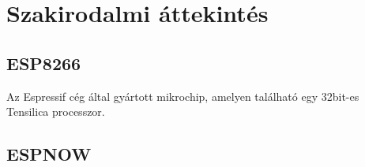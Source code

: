 



\chapter{Szakirodalmi áttekintés}
\section{ESP8266}
Az Espressif cég által gyártott mikrochip, amelyen található egy 32bit-es Tensilica processzor.
\section{ESPNOW}